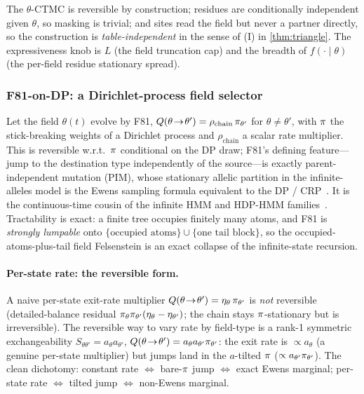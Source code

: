 The $\theta$-CTMC is reversible by construction; residues are
conditionally independent given $\theta$, so masking is trivial;
and sites read the field but never a partner directly, so the
construction is \emph{table-independent} in the sense of (I) in
\autoref{thm:triangle}. The expressiveness knob is $L$ (the field
truncation cap) and the breadth of $f(\cdot\mid\theta)$ (the
per-field residue stationary spread).

\subsubsection{F81-on-DP: a Dirichlet-process field selector}
\label{sec:f81-dp}

Let the field $\theta(t)$ evolve by F81,
$Q(\theta\!\to\!\theta')=\rho_{\mathrm{chain}}\,\pi_{\theta'}$ for
$\theta\neq\theta'$, with $\pi$ the stick-breaking weights of a
Dirichlet process and $\rho_{\mathrm{chain}}$ a scalar rate
multiplier. This is reversible w.r.t.\ $\pi$ conditional on the DP
draw; F81's defining feature---jump to the destination type
independently of the source---is exactly parent-independent
mutation (PIM), whose stationary allelic partition in the
infinite-alleles model is the Ewens sampling formula equivalent to
the DP / CRP~\citep{ewens1972, Kingman1975, EthierKurtz1981}. It
is the continuous-time cousin of the infinite HMM and HDP-HMM
families~\citep{Beal2002, TehJordanBealBlei2006}. Tractability is
exact: a finite tree occupies finitely many atoms, and F81 is
\emph{strongly lumpable} onto $\{\text{occupied atoms}\}\cup\{\text{one tail block}\}$, so the
occupied-atoms-plus-tail field Felsenstein is an exact collapse of
the infinite-state recursion.

\paragraph{Per-state rate: the reversible form.} A naive per-state
exit-rate multiplier $Q(\theta\!\to\!\theta')=\eta_\theta\,\pi_{\theta'}$
is \emph{not} reversible (detailed-balance residual
$\pi_\theta\pi_{\theta'}(\eta_\theta-\eta_{\theta'})$; the chain
stays $\pi$-stationary but is irreversible). The reversible way to
vary rate by field-type is a rank-1 symmetric exchangeability
$S_{\theta\theta'}=a_\theta a_{\theta'}$,
$Q(\theta\!\to\!\theta')=a_\theta a_{\theta'}\pi_{\theta'}$: the
exit rate is $\propto a_\theta$ (a genuine per-state multiplier)
but jumps land in the $a$-tilted $\pi$
($\propto a_{\theta'}\pi_{\theta'}$). The clean dichotomy:
constant rate $\Leftrightarrow$ bare-$\pi$ jump $\Leftrightarrow$
exact Ewens marginal; per-state rate $\Leftrightarrow$ tilted jump
$\Leftrightarrow$ non-Ewens marginal.

